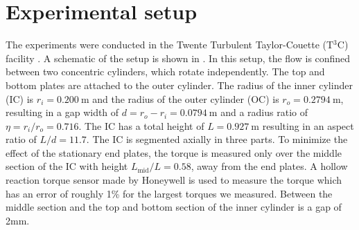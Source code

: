 \section{Experimental setup}\label{sec:experimentalSetup}
The experiments were conducted in the Twente Turbulent Taylor-Couette
(T${}^3$C) facility \citep{vanGils2011}. A schematic of the setup is shown in
. In this setup, the flow is confined between two
concentric cylinders, which rotate independently. The top and bottom plates
are attached to the outer cylinder. The radius of the inner cylinder (IC) is
$r_i = \SI{0.200}{\metre}$ and the radius of the outer cylinder (OC) is $r_o =
\SI{0.2794}{\metre}$, resulting in a gap width of $d = r_o - r_i =
\SI{0.0794}{\metre}$ and a radius ratio of $\eta = r_i/r_o = 0.716$. The IC
has a total height of $L = \SI{0.927}{\metre}$ resulting in an aspect ratio of
$L / d = 11.7$. The IC is segmented axially in three parts. To minimize the
effect of the stationary end plates, the torque is measured only over the
middle section of the IC with height $L_{\text{mid}}/L = 0.58$, away from
the end plates. A hollow reaction torque sensor made by Honeywell is used to
measure the torque which has an error of roughly 1\% for the largest torques
we measured. Between the middle section and the top and bottom section of the
inner cylinder is a gap of 2mm.

